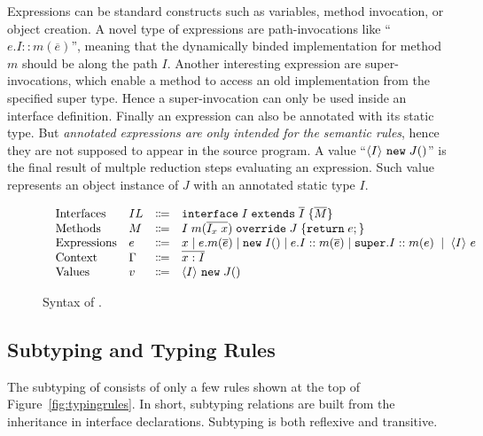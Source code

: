 Expressions can be standard constructs such as variables, method
invocation, or object creation. A novel type of expressions are path-invocations like
``$e.I::m(\overline{e})$'', meaning that the dynamically binded
implementation for method $m$ should be along the path $I$. Another
interesting expression are super-invocations, which enable a method to access an old
implementation from the specified super type. Hence a super-invocation
can only be used inside an interface definition.
Finally an expression can also be annotated with its static type. But \emph{annotated expressions are only intended for the semantic rules},
hence they are not supposed to appear in the source program. A value
``$\langle I \rangle~\texttt{new} \; J()$''
is the final result of multple reduction steps evaluating an
expression. Such value represents an object instance
of $J$ with an annotated static type $I$.

\begin{figure}[t]
\begin{displaymath}
\begin{array}{l}
\begin{array}{llrl}
\text{Interfaces}   & IL & \Coloneqq & \texttt{interface} \; I \; \texttt{extends} \; \overline{I} \; {\{} \overline{M} {\}} \\
\text{Methods}      & M  & \Coloneqq & I \; m (\overline{I_x \; x}) \; \texttt{override} \; J \; {\{} \texttt{return} \; e ; {\}} \\
\text{Expressions}  & e  & \Coloneqq & x \mid
e.m(\overline{e}) \mid
\texttt{new} \; I() \mid
e.I::m(\overline{e}) \mid
\texttt{super}.I::m(e) \; \mid \; \langle I \rangle~e \\
\text{Context}      & \Gamma & \Coloneqq & \overline{x:I} \\
\text{Values}       & v & \Coloneqq & \langle I \rangle~\texttt{new} \; J() \\
\end{array}
\end{array}
\end{displaymath}
\caption{Syntax of \name{}.}\label{fig:syntax}
\end{figure}

\subsection{Subtyping and Typing Rules}
The subtyping of \MIM{} consists of only a few rules shown at the top of Figure~\ref{fig:typingrules}.
In short, subtyping relations are built from the inheritance in interface
declarations. Subtyping is both reflexive and transitive.

